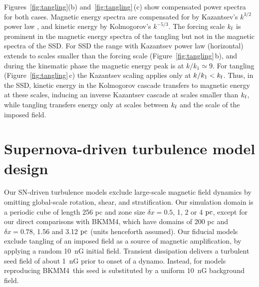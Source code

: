 \documentclass[preprint2]{aastex63}
\newcommand\kf{k_{\rm f} }
\newcommand\pc{~ {\rm pc}}
\newcommand\dx{ {\delta x}}
\newcommand\BKM{{\sf BKMM4}}
\newcommand{\fg}[1]{\textcolor{mypurple}{#1}}
\begin{document}
 {Figures~\ref{fig:tangling}(b) and~\ref{fig:tangling}\,(c) show
 compensated power spectra for both cases.}
 Magnetic energy spectra are compensated {for by} Kazantsev's $k^{3/2}$
 {power law} \citep{Sch02,BS14}, and kinetic energy {by} Kolmogorov's
 $k^{-5/3}$.
 The forcing scale $\kf$ is {prominent} in
 the magnetic energy {spectra of the tangling} but
 {not} {in the magnetic spectra of the SSD}.
 {For SSD the range with Kazantsev power law (horizontal) extends to scales
 smaller than the forcing scale (Figure~\ref{fig:tangling}\,b), and during the
 kinematic phase the magnetic energy peak is at $k/k_1\simeq9$.}
 {For tangling (Figure~\ref{fig:tangling}\,c) the Kazantsev
 {scaling} applies only at $k/k_1<\kf$.} 
 Thus, in the SSD, kinetic energy {in the Kolmogorov cascade} transfers to
 {magnetic energy} 
 at these scales, inducing an inverse Kazantsev {cascade}
 at scales {smaller than} $\kf$, while tangling transfers energy only at
 scales between $\kf$ and the scale of the imposed field.
 
\section{{Supernova-driven} turbulence model design} \label{sec:model}

 {Our} SN-driven turbulence models exclude large-scale magnetic field
 dynamics by {omitting global-scale} rotation, shear, and stratification.
 Our simulation domain is a periodic cube of length 256 pc and zone size
 $\dx=0.5$, 1, 2 or 4$\pc${, except for {our} direct comparisons with
 \BKM, { which have} domains {of} 200 pc and $\dx=0.78$, 1.56 and
 3.12$\pc$ (units henceforth assumed)}.
 \fg{Our fiducial models exclude tangling of an imposed field as a source
 of magnetic amplification, by applying a random 10~nG initial field.
 Transient dissipation delivers a turbulent seed field of
 about 1~nG prior to onset of a dynamo.
 Instead, for models reproducing \BKM\ this seed is substituted by
 a uniform $10$~nG background field.}
\end{document}
